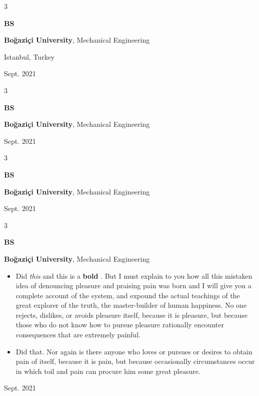 \documentclass[10pt, letterpaper]{article}
\newenvironment{highlights}{
    \begin{itemize}[
        topsep=0.10 cm,
        parsep=0.10 cm,
        partopsep=0pt,
        itemsep=0pt,
        leftmargin=0.4 cm + 10pt
    ]
}{
    \end{itemize}
} %
\newenvironment{threecolentry}[3][]{
    \onecolentry
    \def\thirdColumn{#3}
    \setcolumnwidth{1 cm, \fill, 4.5 cm}
    \begin{paracol}{3}
    {\raggedright #2} \switchcolumn
}{
    \switchcolumn \raggedleft \thirdColumn
    \end{paracol}
    \endonecolentry
} %
\let\hrefWithoutArrow\href
\renewcommand{\href}[2]{\hrefWithoutArrow{#1}{\mbox{\ifthenelse{\equal{#2}{}}{ }{#2 }\raisebox{.15ex}{\footnotesize \faExternalLink*}}}}
\begin{document}
        \vspace{0.2 cm}

        \begin{threecolentry}{\textbf{BS}}{
            Istanbul, Turkey

        Sept. 2021
        }
            \textbf{Boğaziçi University}, Mechanical Engineering
        \end{threecolentry}

        \vspace{0.2 cm}

        \begin{threecolentry}{\textbf{BS}}{
            Sept. 2021
        }
            \textbf{Boğaziçi University}, Mechanical Engineering
        \end{threecolentry}

        \vspace{0.2 cm}

        \begin{threecolentry}{\textbf{BS}}{
            Sept. 2021
        }
            \textbf{Boğaziçi University}, Mechanical Engineering
        \end{threecolentry}

        \vspace{0.2 cm}

        \begin{threecolentry}{\textbf{BS}}{
            Sept. 2021
        }
            \textbf{Boğaziçi University}, Mechanical Engineering
            \begin{highlights}
                \item Did \textit{this} and this is a \textbf{bold} \href{https://example.com}{link}. But I must explain to you how all this mistaken idea of denouncing pleasure and praising pain was born and I will give you a complete account of the system, and expound the actual teachings of the great explorer of the truth, the master-builder of human happiness. No one rejects, dislikes, or avoids pleasure itself, because it is pleasure, but because those who do not know how to pursue pleasure rationally encounter consequences that are extremely painful.
                \item Did that. Nor again is there anyone who loves or pursues or desires to obtain pain of itself, because it is pain, but because occasionally circumstances occur in which toil and pain can procure him some great pleasure.
            \end{highlights}
        \end{threecolentry}
\end{document}
